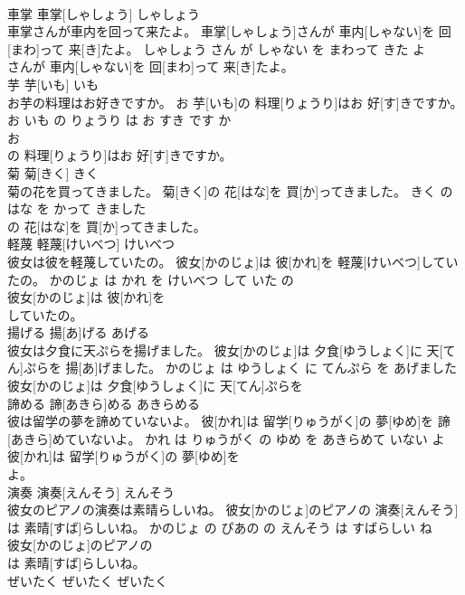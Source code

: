 \documentclass[8pt]{extreport}
\begin{document}
\begin{CJK}{UTF8}{min}
\\	車掌	車掌[しゃしょう]	しゃしょう	
\\	車掌さんが車内を回って来たよ。	車掌[しゃしょう]さんが 車内[しゃない]を 回[まわ]って 来[き]たよ。	しゃしょう さん が しゃない を まわって きた よ	
\\	さんが 車内[しゃない]を 回[まわ]って 来[き]たよ。			
\\	芋	芋[いも]	いも	
\\	お芋の料理はお好きですか。	お 芋[いも]の 料理[りょうり]はお 好[す]きですか。	お いも の りょうり は お すき です か	
\\	お
\\	の 料理[りょうり]はお 好[す]きですか。			
\\	菊	菊[きく]	きく	
\\	菊の花を買ってきました。	菊[きく]の 花[はな]を 買[か]ってきました。	きく の はな を かって きました	
\\	の 花[はな]を 買[か]ってきました。			
\\	軽蔑	軽蔑[けいべつ]	けいべつ	
\\	彼女は彼を軽蔑していたの。	彼女[かのじょ]は 彼[かれ]を 軽蔑[けいべつ]していたの。	かのじょ は かれ を けいべつ して いた の	
\\	彼女[かのじょ]は 彼[かれ]を
\\	していたの。			
\\	揚げる	揚[あ]げる	あげる	
\\	彼女は夕食に天ぷらを揚げました。	彼女[かのじょ]は 夕食[ゆうしょく]に 天[てん]ぷらを 揚[あ]げました。	かのじょ は ゆうしょく に てんぷら を あげました	
\\	彼女[かのじょ]は 夕食[ゆうしょく]に 天[てん]ぷらを
\\	諦める	諦[あきら]める	あきらめる	
\\	彼は留学の夢を諦めていないよ。	彼[かれ]は 留学[りゅうがく]の 夢[ゆめ]を 諦[あきら]めていないよ。	かれ は りゅうがく の ゆめ を あきらめて いない よ	
\\	彼[かれ]は 留学[りゅうがく]の 夢[ゆめ]を
\\	よ。			
\\	演奏	演奏[えんそう]	えんそう	
\\	彼女のピアノの演奏は素晴らしいね。	彼女[かのじょ]のピアノの 演奏[えんそう]は 素晴[すば]らしいね。	かのじょ の ぴあの の えんそう は すばらしい ね	
\\	彼女[かのじょ]のピアノの
\\	は 素晴[すば]らしいね。			
\\	ぜいたく	ぜいたく	ぜいたく	

\end{CJK}
\end{document}
